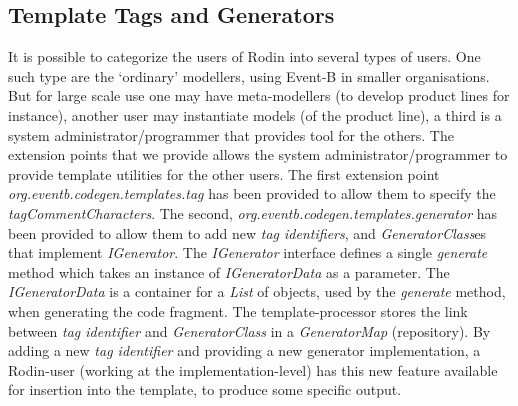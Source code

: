 \documentclass{llncs}%
\begin{document}
\subsection{Template Tags and Generators}
It is possible to categorize the users of Rodin into several types of users. One such type are the `ordinary' modellers, using Event-B in smaller organisations. But for large scale use one may have meta-modellers (to develop product lines for instance), another user may instantiate models (of the product line), a third is a system administrator/programmer that provides tool for the others. The extension points that we provide allows the system administrator/programmer to provide template utilities for the other users. The first extension point \\ \emph{org.eventb.codegen.templates.tag} has been provided to allow them to specify the \emph{tagCommentCharacters}. The second, \emph{org.eventb.codegen.templates.generator} has been provided to allow them to add new \emph{tag identifiers}, and \emph{GeneratorClass}es that implement \emph{IGenerator}. The \emph{IGenerator} interface defines a single \emph{generate} method which takes an instance of \emph{IGeneratorData} as a parameter. The \emph{IGeneratorData}  is a container for  a \emph{List} of objects, used by the \emph{generate} method, when generating the code fragment. The template-processor stores the link between \emph{tag identifier} and \emph{GeneratorClass} in a \emph{GeneratorMap} (repository). By adding a new \emph{tag identifier} and providing a new generator implementation, a Rodin-user (working at the implementation-level) has this new feature available for insertion into the template, to produce some specific output. 
\end{document}
